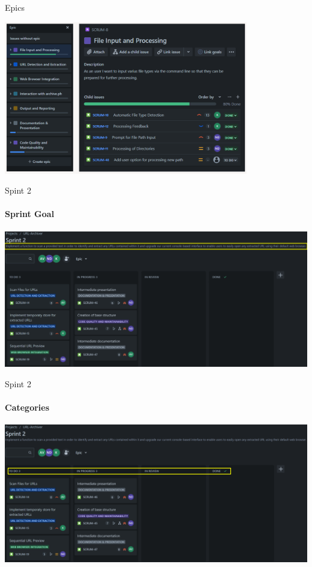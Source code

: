 \documentclass[
    ngerman,%
    authorontitle=true,
]{bfhbeamer}
\begin{document}
    \begin{frame}{Epics}
        \begin{center}
            \includegraphics[width=0.8\textwidth]{pictures/epics}
        \end{center}
    \end{frame}

    \begin{frame}{Spint 2}
        \framesubtitle{Sprint Goal}
        \includegraphics[width=1\textwidth]{pictures/sprint_2_goal}
    \end{frame}

    \begin{frame}{Spint 2}
        \framesubtitle{Categories}
        \includegraphics[width=1\textwidth]{pictures/sprint_2_cat}
    \end{frame}
\end{document}
